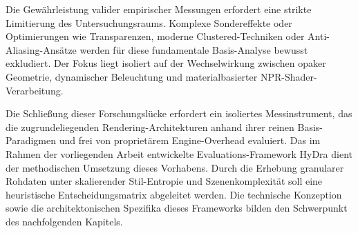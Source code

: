 Die Gewährleistung valider empirischer Messungen erfordert eine strikte Limitierung des Untersuchungsraums.
Komplexe Sondereffekte oder Optimierungen wie Transparenzen, moderne Clustered-Techniken oder Anti-Aliasing-Ansätze
werden für diese fundamentale Basis-Analyse bewusst exkludiert.
Der Fokus liegt isoliert auf der Wechselwirkung zwischen opaker Geometrie, dynamischer Beleuchtung und materialbasierter
\ac{NPR}-Shader-Verarbeitung.

Die Schließung dieser Forschungslücke erfordert ein isoliertes Messinstrument, das die zugrundeliegenden
Rendering-Architekturen anhand ihrer reinen Basis-Paradigmen und frei von proprietärem Engine-Overhead evaluiert.
Das im Rahmen der vorliegenden Arbeit entwickelte Evaluations-Framework \ac{HyDra} dient der methodischen Umsetzung
dieses Vorhabens.
Durch die Erhebung granularer Rohdaten unter skalierender Stil-Entropie und Szenenkomplexität soll eine heuristische
Entscheidungsmatrix abgeleitet werden.
Die technische Konzeption sowie die architektonischen Spezifika dieses Frameworks bilden den Schwerpunkt des
nachfolgenden Kapitels.
